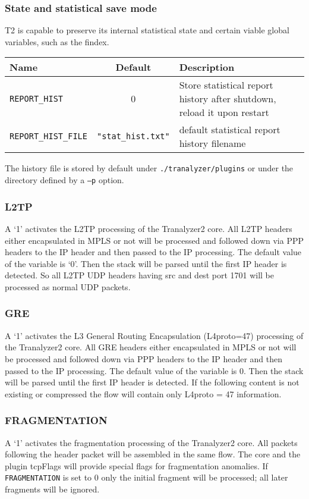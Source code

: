 \subsubsection{State and statistical save mode}
T2 is capable to preserve its internal statistical state and certain viable global variables, such as the findex.

\begin{longtable}{lcl}
    \toprule
    {\bf Name} & {\bf Default} & {\bf Description}\\
    \midrule\endhead%
    {\tt\small REPORT\_HIST} & 0 & Store statistical report history after shutdown, reload it upon restart\\
    {\tt\small REPORT\_HIST\_FILE} & {\tt\small "stat\_hist.txt"} & default statistical report history filename\\
    \bottomrule
\end{longtable}
The history file is stored by default under {\tt ./tranalyzer/plugins} or under the directory defined by a {\tt --p} option.

\subsubsection{L2TP}
A `1' activates the L2TP processing of the Tranalyzer2 core. All L2TP headers either encapsulated in MPLS or not will be processed and followed down via PPP headers to the IP header and then passed to the IP processing. The default value of the variable is `0'. Then the stack will be parsed until the first IP header is detected. So all L2TP UDP headers having src and dest port 1701 will be processed as normal UDP packets.

\subsubsection{GRE}
A `1' activates the L3 General Routing Encapsulation (L4proto=47) processing of the Tranalyzer2 core. All GRE headers either encapsulated in MPLS or not will be processed and followed down via PPP headers to the IP header and then passed to the IP processing. The default value of the variable is 0. Then the stack will be parsed until the first IP header is detected. If the following content is not existing or compressed the flow will contain only L4proto = 47 information.

\subsubsection{FRAGMENTATION}
A `1' activates the fragmentation processing of the Tranalyzer2 core. All packets following the header packet will be assembled in the same flow. The core and the plugin tcpFlags will provide special flags for fragmentation anomalies. If {\tt FRAGMENTATION} is set to 0 only the initial fragment will be processed; all later fragments will be ignored.

